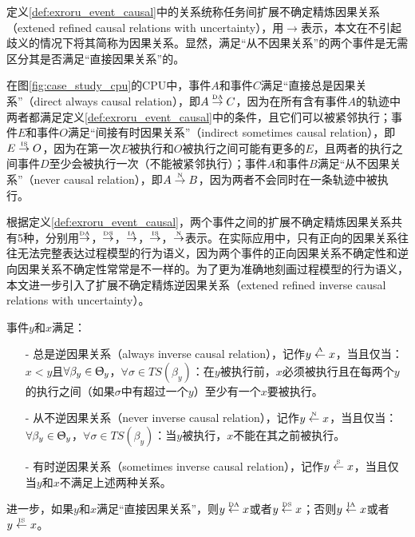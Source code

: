 定义\ref{def:exroru_event_causal}中的关系统称任务间扩展不确定精炼因果关系（extened refined causal relations with uncertainty），用$\rightarrow$表示，本文在不引起歧义的情况下将其简称为因果关系。显然，满足“从不因果关系”的两个事件是无需区分其是否满足“直接因果关系”的。

\begin{example}\label{ex:exroru_event_causal}
在图\ref{fig:case_study_cpu}的CPU中，事件$A$和事件$C$满足“直接总是因果关系”（direct always causal relation），即$A\overset{\text{\tiny{DA}}}{\rightarrow}C$，因为在所有含有事件$A$的轨迹中两者都满足定义\ref{def:exroru_event_causal}中的条件，且它们可以被紧邻执行；事件$E$和事件$O$满足“间接有时因果关系”（indirect sometimes causal relation），即$E\overset{\text{\tiny{IS}}}{\rightarrow}O$，因为在第一次$E$被执行和$O$被执行之间可能有更多的$E$，且两者的执行之间事件$D$至少会被执行一次（不能被紧邻执行）；事件$A$和事件$B$满足“从不因果关系”（never causal relation），即$A\overset{\text{\tiny{N}}}{\rightarrow}B$，因为两者不会同时在一条轨迹中被执行。
\end{example}

根据定义\ref{def:exroru_event_causal}，两个事件之间的扩展不确定精炼因果关系共有5种，分别用$\overset{\text{\tiny{DA}}}{\rightarrow}$，$\overset{\text{\tiny{DS}}}{\rightarrow}$，$\overset{\text{\tiny{IA}}}{\rightarrow}$，$\overset{\text{\tiny{IS}}}{\rightarrow}$，$\overset{\text{\tiny{N}}}{\rightarrow}$表示。在实际应用中，只有正向的因果关系往往无法完整表达过程模型的行为语义，因为两个事件的正向因果关系不确定性和逆向因果关系不确定性常常是不一样的。为了更为准确地刻画过程模型的行为语义，本文进一步引入了扩展不确定精炼逆因果关系（extened refined inverse causal relations with uncertainty）。

\begin{definition}[事件间扩展不确定精炼逆因果关系]\label{def:exroru_event_inverse_causal}
事件$y$和$x$满足：
  \begin{itemize}
  	\item[-] 总是逆因果关系（always inverse causal relation），记作$y\overset{\text{\tiny{A}}}{\leftarrow}x$，当且仅当：$x<y$且$\forall\beta_{y}\in\Uptheta_{y}$，$\forall\sigma\in TS(\beta_{y})$：在$y$被执行前，$x$必须被执行且在每两个$y$的执行之间（如果$\sigma$中有超过一个$y$）至少有一个$x$要被执行。
  	\item[-] 从不逆因果关系（never inverse causal relation），记作$y\overset{\text{\tiny{N}}}{\leftarrow}x$，当且仅当：$\forall\beta_{y}\in\Uptheta_{y}$，$\forall\sigma\in TS(\beta_{y})$：当$y$被执行，$x$不能在其之前被执行。
  	\item[-] 有时逆因果关系（sometimes inverse causal relation），记作$y\overset{\text{\tiny{S}}}{\leftarrow}x$，当且仅当$y$和$x$不满足上述两种关系。
  \end{itemize}
进一步，如果$y$和$x$满足“直接因果关系”，则$y\overset{\text{\tiny{DA}}}{\leftarrow}x$或者$y\overset{\text{\tiny{DS}}}{\leftarrow}x$；否则$y\overset{\text{\tiny{IA}}}{\leftarrow}x$或者$y\overset{\text{\tiny{IS}}}{\leftarrow}x$。
\end{definition}

